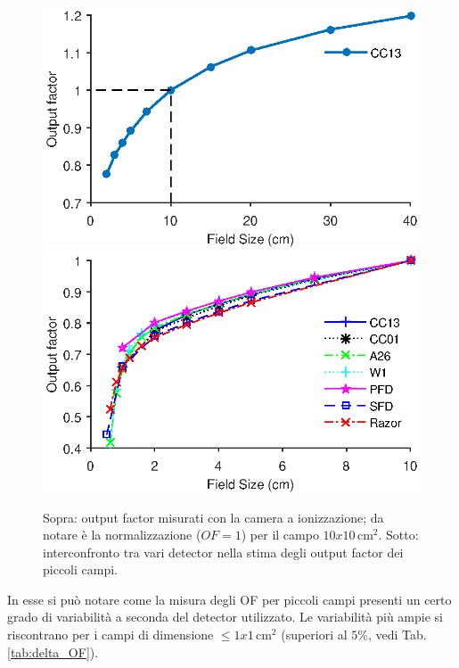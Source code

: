 \begin{figure}[!t]
\centering
\includegraphics[width=.8\textwidth]{./cap2/OF_plots/OFCC13.eps}\\
\includegraphics[width=.8\textwidth]{./cap2/OF_plots/OFSmall.eps}
\caption{Sopra: output factor misurati con la camera a ionizzazione; da notare è la normalizzazione ($OF=1$) per il campo $10x10\,$cm$^2$. Sotto: interconfronto tra vari detector nella stima degli output factor dei piccoli campi.}
\label{fig:OF_res}
\end{figure}
In esse si può notare come la misura degli OF per piccoli campi presenti un certo grado di variabilità a seconda del detector utilizzato. Le variabilità più ampie si riscontrano per i campi di dimensione $\leq 1x1\,$cm$^2$ (superiori al $5\%$, vedi Tab.\ref{tab:delta_OF}). 

